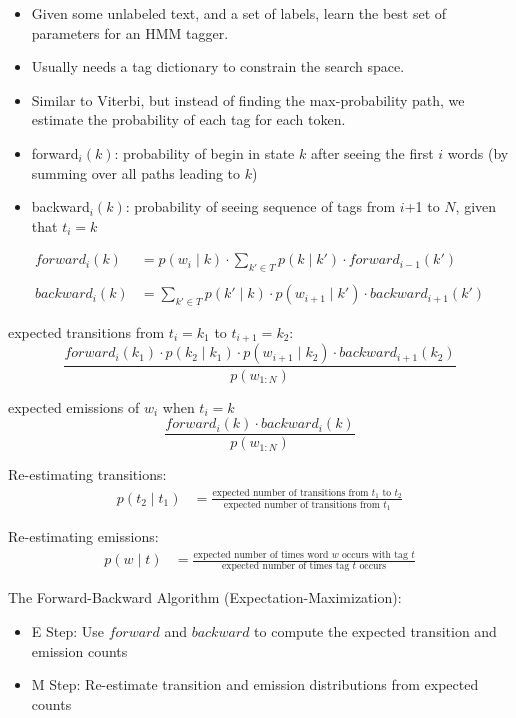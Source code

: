\documentclass[11pt,letterpaper]{article}
\begin{document}
\begin{itemize}
  \item Given some unlabeled text, and a set of labels, learn the best set of parameters for an HMM tagger.
  \item Usually needs a tag dictionary to constrain the search space.
  \item Similar to Viterbi, but instead of finding the max-probability path, we estimate the probability of each tag for each token.
  \item forward$_i(k)$: probability of begin in state $k$ after seeing the first $i$ words (by summing over all paths leading to $k$)
  \item backward$_i(k)$: probability of seeing sequence of tags from $i$+1 to $N$, given that $t_i=k$
\end{itemize}
\begin{align*}
  forward_i(k) %
               &= p(w_i \mid k) \cdot \sum_{k' \in T} p(k \mid k') \cdot forward_{i-1}(k') \\\\
  backward_i(k) %
                &= \sum_{k' \in T} p(k' \mid k) \cdot p(w_{i+1} \mid k') \cdot backward_{i+1}(k')
\end{align*}

expected transitions from $t_i=k_1$ to $t_{i+1}=k_2$: 
\[
  \frac{forward_i(k_1) \cdot p(k_2 \mid k_1) \cdot p(w_{i+1} \mid k_2) \cdot backward_{i+1}(k_2)}
       {p(w_{1:N})}
\]

expected emissions of $w_i$ when $t_i=k$
\[
  \frac{forward_i(k) \cdot backward_i(k)}
       {p(w_{1:N})}
\]

Re-estimating transitions:
\begin{align*}
  p(t_2 \mid t_1) &= \frac{\text{expected number of transitions from $t_1$ to $t_2$}}
                          {\text{expected number of transitions from $t_1$}}
\end{align*}

Re-estimating emissions:
\begin{align*}
  p(w \mid t) &= \frac{\text{expected number of times word $w$ occurs with tag $t$}}
                      {\text{expected number of times tag $t$ occurs}}
\end{align*}

The Forward-Backward Algorithm (Expectation-Maximization):

\begin{itemize}
  \item E Step: Use $forward$ and $backward$ to compute the expected transition and emission counts
  \item M Step: Re-estimate transition and emission distributions from expected counts
\end{itemize}
\end{document}
